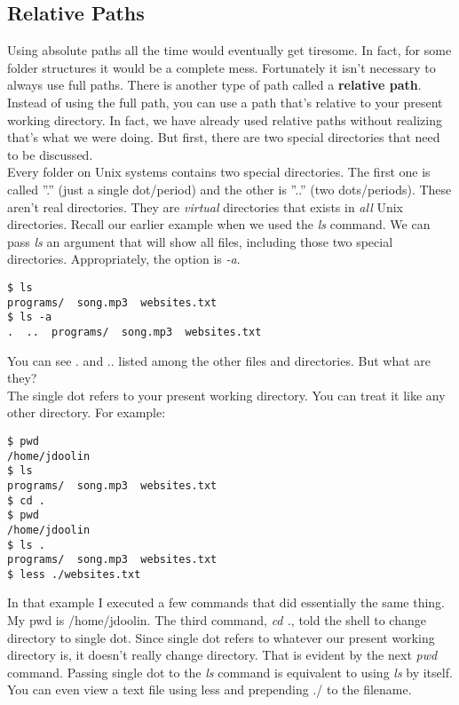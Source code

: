 \subsection{Relative Paths}

Using absolute paths all the time would eventually get tiresome.  In fact, for some folder structures it would be a complete mess.  Fortunately it isn't necessary to always use full paths.  There is another type of path called a \textbf{relative path}.  Instead of using the full path, you can use a path that's relative to your present working directory.  In fact, we have already used relative paths without realizing that's what we were doing.  But first, there are two special directories that need to be discussed.\\

Every folder on Unix systems contains two special directories.  The first one is called ''.'' (just a single dot/period) and the other is ''..'' (two dots/periods).  These aren't real directories. They are \textit{virtual} directories that exists in \textit{all} Unix directories.  Recall our earlier example when we used the \textit{ls} command.  We can pass \textit{ls} an argument that will show all files, including those two special directories.  Appropriately, the option is \textit{-a}.

\begin{verbatim}
$ ls
programs/  song.mp3  websites.txt
$ ls -a
.  ..  programs/  song.mp3  websites.txt
\end{verbatim}

You can see . and .. listed among the other files and directories.  But what are they?\\

The single dot refers to your present working directory.  You can treat it like any other directory.  For example:

\begin{verbatim}
$ pwd
/home/jdoolin
$ ls
programs/  song.mp3  websites.txt
$ cd .
$ pwd
/home/jdoolin
$ ls .
programs/  song.mp3  websites.txt
$ less ./websites.txt
\end{verbatim}

In that example I executed a few commands that did essentially the same thing.  My pwd is /home/jdoolin.  The third command, \textit{cd .}, told the shell to change directory to single dot.  Since single dot refers to whatever our present working directory is, it doesn't really change directory.  That is evident by the next \textit{pwd} command.  Passing single dot to the \textit{ls} command is equivalent to using \textit{ls} by itself.  You can even view a text file using less and prepending ./ to the filename.\\


